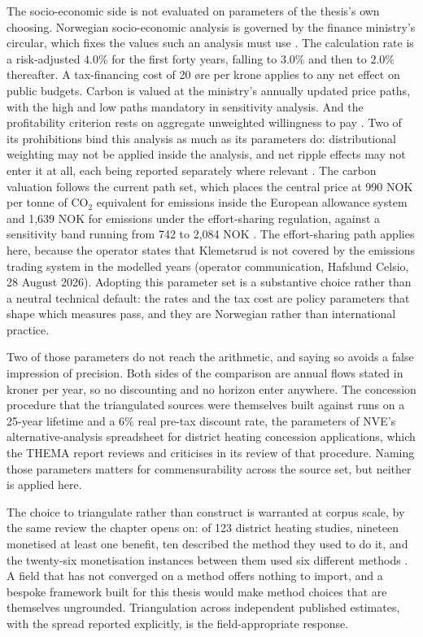 The socio-economic side is not evaluated on parameters of the thesis's own choosing. Norwegian socio-economic analysis is governed by the finance ministry's circular, which fixes the values such an analysis must use \cite{finansdepartement_prinsipper_2021}. The calculation rate is a risk-adjusted $4.0\%$ for the first forty years, falling to $3.0\%$ and then to $2.0\%$ thereafter. A tax-financing cost of 20 øre per krone applies to any net effect on public budgets. Carbon is valued at the ministry's annually updated price paths, with the high and low paths mandatory in sensitivity analysis. And the profitability criterion rests on aggregate unweighted willingness to pay \cite{finansdepartement_prinsipper_2021}. Two of its prohibitions bind this analysis as much as its parameters do: distributional weighting may not be applied inside the analysis, and net ripple effects may not enter it at all, each being reported separately where relevant \cite{finansdepartement_prinsipper_2021}. The carbon valuation follows the current path set, which places the central price at 990 NOK per tonne of CO$_2$ equivalent for emissions inside the European allowance system and 1,639 NOK for emissions under the effort-sharing regulation, against a sensitivity band running from 742 to 2,084 NOK \cite{finansdepartementet_karbonprisbaner_2025}. The effort-sharing path applies here, because the operator states that Klemetsrud is not covered by the emissions trading system in the modelled years (operator communication, Hafslund Celsio, 28 August 2026). Adopting this parameter set is a substantive choice rather than a neutral technical default: the rates and the tax cost are policy parameters that shape which measures pass, and they are Norwegian rather than international practice.

Two of those parameters do not reach the arithmetic, and saying so avoids a false impression of precision. Both sides of the comparison are annual flows stated in kroner per year, so no discounting and no horizon enter anywhere. The concession procedure that the triangulated sources were themselves built against runs on a 25-year lifetime and a $6\%$ real pre-tax discount rate, the parameters of NVE's alternative-analysis spreadsheet for district heating concession applications, which the THEMA report reviews and criticises \cite{Thema_fjernvarme_2024} in its review of that procedure. Naming those parameters matters for commensurability across the source set, but neither is applied here.

The choice to triangulate rather than construct is warranted at corpus scale, by the same review the chapter opens on: of 123 district heating studies, nineteen monetised at least one benefit, ten described the method they used to do it, and the twenty-six monetisation instances between them used six different methods \cite{ahmed_district_2025}. A field that has not converged on a method offers nothing to import, and a bespoke framework built for this thesis would make method choices that are themselves ungrounded. Triangulation across independent published estimates, with the spread reported explicitly, is the field-appropriate response.


